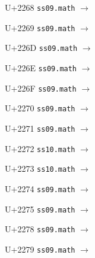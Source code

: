 \documentclass{article}
\begin{document}
\begin{substitutions}
\goodbreak

U+2268  \linebreak
    \texttt{ss09.math} $\to$  

\goodbreak

U+2269  \linebreak
    \texttt{ss09.math} $\to$  

\goodbreak

U+226D  \linebreak
    \texttt{ss09.math} $\to$  

\goodbreak

U+226E  \linebreak
    \texttt{ss09.math} $\to$  

\goodbreak

U+226F  \linebreak
    \texttt{ss09.math} $\to$  

\goodbreak

U+2270  \linebreak
    \texttt{ss09.math} $\to$  

\goodbreak

U+2271  \linebreak
    \texttt{ss09.math} $\to$  

\goodbreak

U+2272  \linebreak
    \texttt{ss10.math} $\to$  

\goodbreak

U+2273  \linebreak
    \texttt{ss10.math} $\to$  

\goodbreak

U+2274  \linebreak
    \texttt{ss09.math} $\to$  

\goodbreak

U+2275  \linebreak
    \texttt{ss09.math} $\to$  

\goodbreak

U+2278  \linebreak
    \texttt{ss09.math} $\to$  

\goodbreak

U+2279  \linebreak
    \texttt{ss09.math} $\to$  


\end{substitutions}
\end{document}
